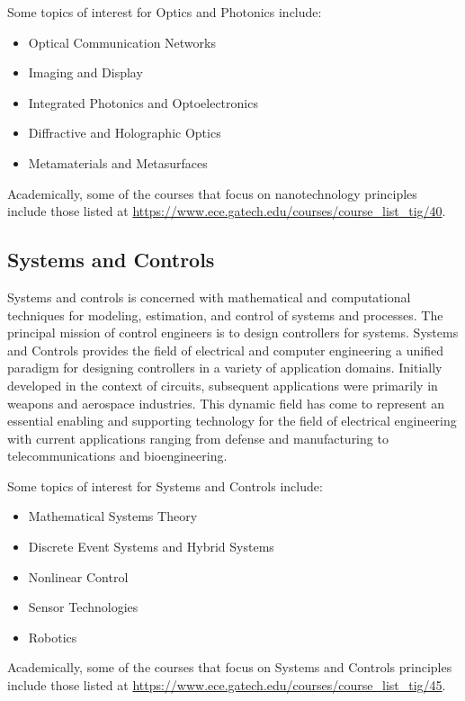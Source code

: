 \documentclass[12pt]{article}
\begin{document}
Some topics of interest for Optics and Photonics include:

\begin{itemize}
    \item Optical Communication Networks
    \item Imaging and Display
    \item Integrated Photonics and Optoelectronics
    \item Diffractive and Holographic Optics
    \item Metamaterials and Metasurfaces
\end{itemize}

Academically, some of the courses that focus on nanotechnology principles include those listed at \url{https://www.ece.gatech.edu/courses/course_list_tig/40}.

\subsection{Systems and Controls}

Systems and controls is concerned with mathematical and computational techniques for modeling, estimation, and control of systems and processes. The principal mission of control engineers is to design controllers for systems. Systems and Controls provides the field of electrical and computer engineering a unified paradigm for designing controllers in a variety of application domains. Initially developed in the context of circuits, subsequent applications were primarily in weapons and aerospace industries. This dynamic field has come to represent an essential enabling and supporting technology for the field of electrical engineering with current applications ranging from defense and manufacturing to telecommunications and bioengineering.

Some topics of interest for Systems and Controls include:

\begin{itemize}
    \item Mathematical Systems Theory
    \item Discrete Event Systems and Hybrid Systems
    \item Nonlinear Control
    \item Sensor Technologies
    \item Robotics
\end{itemize}

Academically, some of the courses that focus on Systems and Controls principles include those listed at \url{https://www.ece.gatech.edu/courses/course_list_tig/45}.
\end{document}
